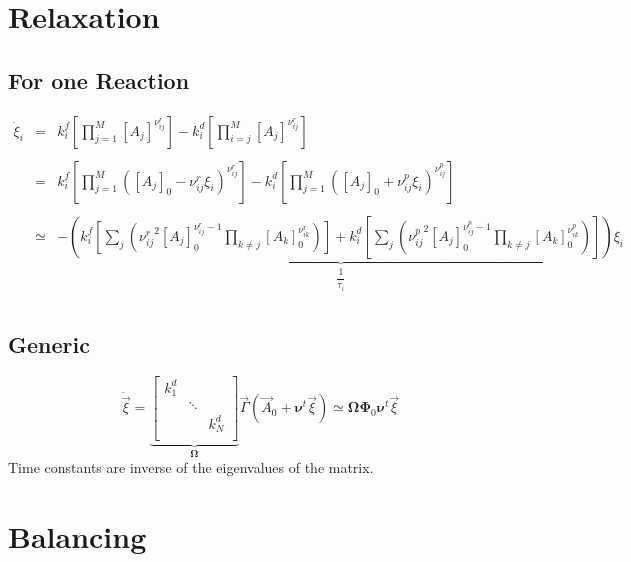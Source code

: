 \documentclass[aps,onecolumn,11pt]{revtex4}
\begin{document}
\section{Relaxation}

\subsection{For one Reaction}
\begin{equation}
\begin{array}{rcl}
\dot{\xi}_i & = &  \displaystyle k^f_i \left[ \prod_{j=1}^M [A_j]^{\nu^r_{ij}}  \right] - k^d_i \left[ \prod_{i=j}^M [A_j]^{\nu^r_{ij}} \right] \\
\\
 & = &  \displaystyle k^f_i \left[ \prod_{j=1}^M ([A_j]_0 - \nu^r_{ij} \xi_i )^{\nu^r_{ij}}  \right] 
 -   k^d_i \left[ \prod_{j=1}^M ([A_j]_0 + \nu^p_{ij} \xi_i )^{\nu^p_{ij}}  \right] \\
 \\
 & \simeq & \displaystyle
- \underbrace{\left(
  k^f_i \left[ \sum_j \left( {\nu^r_{ij}}^2 [A_j]_0^{\nu^r_{ij}-1} \prod_{k\not=j} [A_k]_0^{\nu^r_{ik}}\right) \right]
 +k^d_i \left[ \sum_j \left( {\nu^p_{ij}}^2 [A_j]_0^{\nu^p_{ij}-1} \prod_{k\not=j} [A_k]_0^{\nu^p_{ik}}\right) \right]
  \right)}_{\dfrac{1}{\tau_i}} \xi_i
 \\
\end{array}
\end{equation}

\subsection{Generic}

\begin{equation}
	\dot{\vec{\xi}} = 
	\underbrace{
	\begin{bmatrix}
	k^d_1 &  &\\
	      & \ddots & \\
	      & & k^d_N\\ 
	\end{bmatrix}
	}_{\bm{\Omega}}
	\vec{\Gamma}(\vec{A}_0 + \bm{\nu}^t \vec{\xi})
	\simeq \bm{\Omega} \bm{\Phi}_0 \bm{\nu}^t \vec{\xi}
\end{equation}
Time constants are inverse of the eigenvalues of the matrix.

\section{Balancing}
\end{document}
